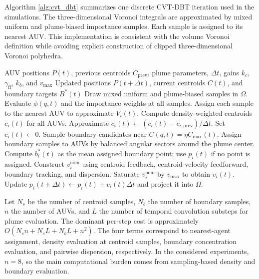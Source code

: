 \documentclass[conference]{IEEEtran}
\begin{document}
Algorithm \ref{alg:cvt_dbt} summarizes one discrete CVT-DBT iteration used in the simulations. The three-dimensional Voronoi integrals are approximated by mixed uniform and plume-biased importance samples. Each sample is assigned to its nearest AUV. This implementation is consistent with the volume Voronoi definition while avoiding explicit construction of clipped three-dimensional Voronoi polyhedra.

\begin{algorithm}[t]
\caption{CVT-DBT Iteration for Dynamic Underwater Oil Plume Monitoring}
\label{alg:cvt_dbt}
\begin{algorithmic}[1]
\REQUIRE AUV positions $P(t)$, previous centroids $C_{\mathrm{prev}}$, plume parameters, $\Delta t$, gains $k_c$, $\gamma_{\mathrm{ff}}$, $k_b$, and $v_{\max}$
\ENSURE Updated positions $P(t+\Delta t)$, current centroids $C(t)$, and boundary targets $B^{\ast}(t)$
\STATE Draw mixed uniform and plume-biased samples in $\Omega$.
\STATE Evaluate $\phi(q,t)$ and the importance weights at all samples.
\STATE Assign each sample to the nearest AUV to approximate $V_i(t)$.
\STATE Compute density-weighted centroids $c_i(t)$ for all AUVs.
\STATE Approximate $\dot c_i(t)\leftarrow(c_i(t)-c_{i,\mathrm{prev}})/\Delta t$.
\ELSE
\STATE Set $\dot c_i(t)\leftarrow0$.
\ENDIF
\STATE Sample boundary candidates near $C(q,t)=\eta C_{\max}(t)$.
\STATE Assign boundary samples to AUVs by balanced angular sectors around the plume center.
\STATE Compute $b_i^{\ast}(t)$ as the mean assigned boundary point; use $p_i(t)$ if no point is assigned.
\STATE Construct $v_i^{\mathrm{nom}}$ using centroid feedback, centroid-velocity feedforward, boundary tracking, and dispersion.
\STATE Saturate $v_i^{\mathrm{nom}}$ by $v_{\max}$ to obtain $v_i(t)$.
\STATE Update $p_i(t+\Delta t)\leftarrow p_i(t)+v_i(t)\Delta t$ and project it into $\Omega$.
\end{algorithmic}
\end{algorithm}

Let $N_s$ be the number of centroid samples, $N_b$ the number of boundary samples, $n$ the number of AUVs, and $L$ the number of temporal convolution substeps for plume evaluation. The dominant per-step cost is approximately $O(N_s n+N_sL+N_bL+n^2)$. The four terms correspond to nearest-agent assignment, density evaluation at centroid samples, boundary concentration evaluation, and pairwise dispersion, respectively. In the considered experiments, $n=8$, so the main computational burden comes from sampling-based density and boundary evaluation.
\end{document}
